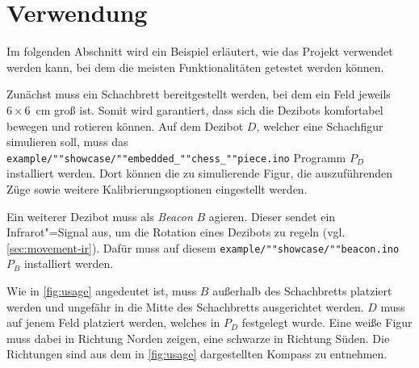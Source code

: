 
\section{Verwendung}

Im folgenden Abschnitt wird ein Beispiel erläutert, wie das Projekt verwendet werden kann, bei dem die meisten Funktionalitäten getestet werden können.

Zunächst muss ein Schachbrett bereitgestellt werden, bei dem ein Feld jeweils \mbox{$6\times6$~cm} groß ist. Somit wird garantiert, dass sich die Dezibots komfortabel bewegen und rotieren können. Auf dem Dezibot $D$, welcher eine Schachfigur simulieren soll, muss das \texttt{example/""showcase/""embedded\_""chess\_""piece.ino} Programm $P_D$ installiert werden. Dort können die zu simulierende Figur, die auszuführenden Züge sowie weitere Kalibrierungsoptionen eingestellt werden.

Ein weiterer Dezibot muss als \emph{Beacon} $B$ agieren. Dieser sendet ein Infrarot"=Signal aus, um die Rotation eines Dezibots zu regeln (vgl. \autoref{sec:movement-ir}). Dafür muss auf diesem \texttt{example/""showcase/""beacon.ino} $P_B$ installiert werden.

Wie in \autoref{fig:usage} angedeutet ist, muss $B$ außerhalb des Schachbretts platziert werden und ungefähr in die Mitte des Schachbretts ausgerichtet werden. $D$ muss auf jenem Feld platziert werden, welches in $P_D$ festgelegt wurde. Eine weiße Figur muss dabei in Richtung Norden zeigen, eine schwarze in Richtung Süden. Die Richtungen sind aus dem in \autoref{fig:usage} dargestellten Kompass zu entnehmen.


